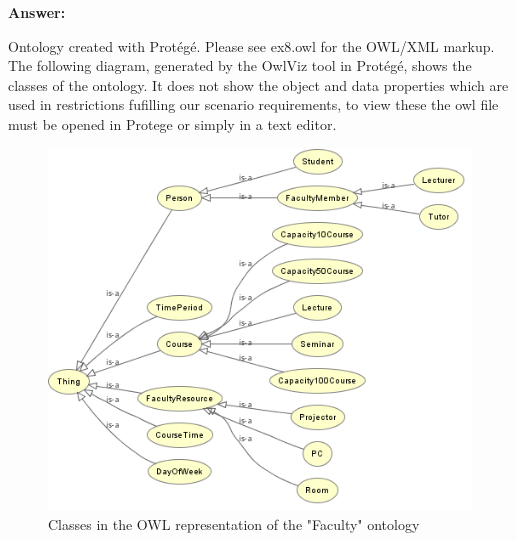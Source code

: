 \documentclass[10pt,a4paper]{article}
\begin{document}
\begin{enumerate}
\begin{enumerate}
\textbf{Answer:}

Ontology created with Protégé. Please see ex8.owl for the OWL/XML markup. The following diagram, generated by the OwlViz tool in Protégé, shows the classes of the ontology. It does not show the object and data properties which are used in restrictions fufilling our scenario requirements, to view these the owl file must be opened in Protege or simply in a text editor.

\begin{figure}[H]
  \caption{Classes in the OWL representation of the "Faculty" ontology}
  \centering
    \includegraphics[scale=0.7]{owl_graph.png}
\end{figure}


\end{enumerate}

\end{enumerate}
\end{document}
